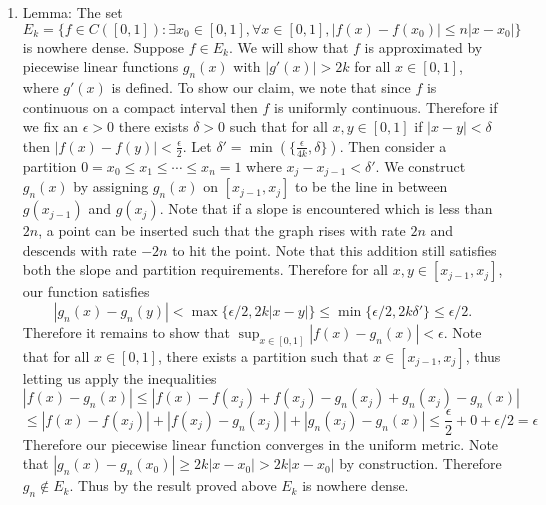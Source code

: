 \documentclass[12pt, letterpaper]{article}
\begin{document}
\begin{enumerate}
\begin{itemize}
		\iffalse Suppose for contradiction that there exists $B(a,r) \subset E$.
		Note that there exists $y \in E^c$ where $d(a,y) < \frac{r}{2}$.  That implies $y \in B(a,r)\subset E$, which
		contradicts $y \in E^c$.  \fi 
	\end{itemize}
	\item 
	Lemma: The set $E_k = \{f \in C([0,1]): \exists x_0 \in [0,1], \forall x \in [0,1], |f(x) - f(x_0)| \leq n|x - x_0|\}$ 
	is nowhere dense.  Suppose $f \in E_k$.  We will show that $f$ is approximated by piecewise linear functions $g_n(x)$
	with $|g'(x)| > 2k$ for all $x \in [0,1]$, where $g'(x)$ is defined.  To show our claim, we note that since $f$ is 
	continuous on a compact interval then $f$ is uniformly continuous.  Therefore if we fix an $\epsilon > 0$ there 
	exists $\delta > 0$ such that for all $x,y \in [0,1]$ if $|x-y| < \delta$ then $|f(x) - f(y)| < \frac{\epsilon}{2}$.
	Let $\delta' = \min(\{\frac{\epsilon}{4k}, \delta\})$.  Then consider a partition $0 = x_0\leq x_1 \leq \cdots \leq x_n = 1$ where $x_j -x_{j-1} < \delta'$.  We construct $g_n(x)$ by assigning $g_n(x)$ on $[x_{j-1},x_j]$ to be the line 
	in between $g(x_{j-1})$ and $g(x_j)$.  Note that if a slope is encountered which is less than $2n$, a point can be 
	inserted such that the graph rises with rate $2n$ and descends with rate $-2n$ to hit the point.  Note that this 
	addition still satisfies both the slope and partition requirements.  Therefore for all $x,y \in [x_{j-1},x_j]$, our
	function satisfies 
	$$|g_n(x) - g_n(y)| < \max \{\epsilon/2, 2k|x-y|\} \leq \min\{\epsilon/2, 2k \delta '\} \leq \epsilon/2.$$  
	Therefore it remains to show that $\sup_{x \in [0,1]} |f(x) - g_n(x)| < \epsilon$.  Note that for all $x \in [0,1]$,
	there exists a partition such that $x \in [x_{j-1},x_j]$, thus letting us apply the inequalities 
	$$
	|f(x) - g_n(x)| \leq |f(x) - f(x_j) + f(x_j) - g_n(x_j) + g_n(x_j) - g_n(x)|$$ $$\leq 	|f(x) - f(x_j)| + |f(x_j) - g_n(x_j)| + 
	|g_n(x_j) - g_n(x)| \leq \frac{\epsilon}{2} + 0 + \epsilon/2 = \epsilon
	$$
	Therefore our piecewise linear function converges in the uniform metric.  
	Note that $|g_n(x) - g_n(x_0)| \geq 2k|x-x_0| > 2k|x-x_0|$ by construction.  Therefore $g_n \not \in E_k$.  
	Thus by the result proved above $E_k$ is nowhere dense.  \\
	
	
	
	
	

\end{enumerate}
\end{document}
